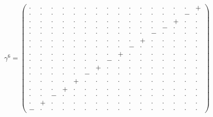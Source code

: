 \documentclass[
  10pt,
]{article}
\begin{document}
\[\gamma^6=\left(\begin{smallmatrix} \cdot & \cdot & \cdot & \cdot & \cdot & \cdot & \cdot & \cdot & \cdot & \cdot & \cdot & \cdot & \cdot & \cdot & \cdot & + \\ \cdot & \cdot & \cdot & \cdot & \cdot & \cdot & \cdot & \cdot & \cdot & \cdot & \cdot & \cdot & \cdot & \cdot & - & \cdot \\ \cdot & \cdot & \cdot & \cdot & \cdot & \cdot & \cdot & \cdot & \cdot & \cdot & \cdot & \cdot & \cdot & + & \cdot & \cdot \\ \cdot & \cdot & \cdot & \cdot & \cdot & \cdot & \cdot & \cdot & \cdot & \cdot & \cdot & \cdot & - & \cdot & \cdot & \cdot \\ \cdot & \cdot & \cdot & \cdot & \cdot & \cdot & \cdot & \cdot & \cdot & \cdot & \cdot & - & \cdot & \cdot & \cdot & \cdot \\ \cdot & \cdot & \cdot & \cdot & \cdot & \cdot & \cdot & \cdot & \cdot & \cdot & + & \cdot & \cdot & \cdot & \cdot & \cdot \\ \cdot & \cdot & \cdot & \cdot & \cdot & \cdot & \cdot & \cdot & \cdot & - & \cdot & \cdot & \cdot & \cdot & \cdot & \cdot \\ \cdot & \cdot & \cdot & \cdot & \cdot & \cdot & \cdot & \cdot & + & \cdot & \cdot & \cdot & \cdot & \cdot & \cdot & \cdot \\ \cdot & \cdot & \cdot & \cdot & \cdot & \cdot & \cdot & - & \cdot & \cdot & \cdot & \cdot & \cdot & \cdot & \cdot & \cdot \\ \cdot & \cdot & \cdot & \cdot & \cdot & \cdot & + & \cdot & \cdot & \cdot & \cdot & \cdot & \cdot & \cdot & \cdot & \cdot \\ \cdot & \cdot & \cdot & \cdot & \cdot & - & \cdot & \cdot & \cdot & \cdot & \cdot & \cdot & \cdot & \cdot & \cdot & \cdot \\ \cdot & \cdot & \cdot & \cdot & + & \cdot & \cdot & \cdot & \cdot & \cdot & \cdot & \cdot & \cdot & \cdot & \cdot & \cdot \\ \cdot & \cdot & \cdot & + & \cdot & \cdot & \cdot & \cdot & \cdot & \cdot & \cdot & \cdot & \cdot & \cdot & \cdot & \cdot \\ \cdot & \cdot & - & \cdot & \cdot & \cdot & \cdot & \cdot & \cdot & \cdot & \cdot & \cdot & \cdot & \cdot & \cdot & \cdot \\ \cdot & + & \cdot & \cdot & \cdot & \cdot & \cdot & \cdot & \cdot & \cdot & \cdot & \cdot & \cdot & \cdot & \cdot & \cdot \\ - & \cdot & \cdot & \cdot & \cdot & \cdot & \cdot & \cdot & \cdot & \cdot & \cdot & \cdot & \cdot & \cdot & \cdot & \cdot \end{smallmatrix}\right)\qquad
\]
\end{document}
